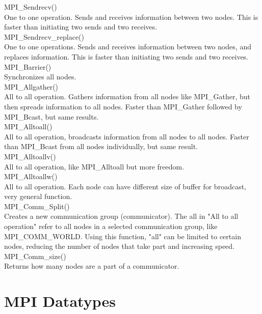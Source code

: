 \documentclass[a4paper,norsk,11pt,twoside]{report}
\begin{document}
MPI\_Sendrecv() \\
One to one operation. Sends and receives information between two nodes. This is faster than initiating two sends and two receives. \\

MPI\_Sendrecv\_replace() \\
One to one operations. Sends and receives information between two nodes, and replaces information. This is faster than initiating two sends and two receives. \\

MPI\_Barrier() \\
Synchronizes all nodes. \\

MPI\_Allgather() \\
All to all operation. Gathers information from all nodes like MPI\_Gather, but then spreads information to all nodes. Faster than MPI\_Gather followed by MPI\_Bcast, but same results. \\

MPI\_Alltoall() \\
All to all operation, broadcasts information from all nodes to all nodes. Faster than MPI\_Bcast from all nodes individually, but same result. \\

MPI\_Alltoallv() \\
All to all operation, like MPI\_Alltoall but more freedom. \\

MPI\_Alltoallw() \\
All to all operation. Each node can have different size of buffer for broadcast, very general function. \\

MPI\_Comm\_Split() \\
Creates a new communication group (communicator). The all in "All to all operation" refer to all nodes in a selected communication group, like MPI\_COMM\_WORLD. Using this function, "all" can be limited to certain nodes, reducing the number of nodes that take part and increasing speed. \\

MPI\_Comm\_size() \\
Returns how many nodes are a part of a communicator. 



\section{MPI Datatypes}
\end{document}

